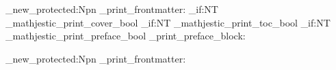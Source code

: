 \ExplSyntaxOn

\cs_new_protected:Npn \mathjestic_print_frontmatter:
  {
    \bool_if:NT \g_mathjestic_print_cover_bool { \makecover \clearpage }
    \bool_if:NT \g_mathjestic_print_toc_bool   { \tableofcontents \clearpage }
    \bool_if:NT \g_mathjestic_print_preface_bool
      { \mathjestic_print_preface_block: }
  }

\cs_new_protected:Npn \mathjesticPrintFrontmatter
  { \mathjestic_print_frontmatter: }

\ExplSyntaxOff
